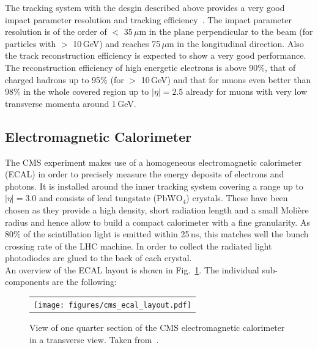 The tracking system with the desgin described above provides a very good impact parameter resolution and tracking efficiency~\cite{bib:cmstdr:tracker}. The impact parameter resolution is of the order of $<$ 35\,$\mu$m in the plane perpendicular to the beam (for particles with \pt $>$ 10\,GeV) and reaches 75\,$\mu$m in the longitudinal direction. Also the track reconstruction efficiency is expected to show a very good performance. The reconstruction efficiency of high energetic electrons is above 90\%, that of charged hadrons up to 95\% (for \pt $>$ 10\,GeV) and that for muons even better than 98\% in the whole covered region up to $|\eta| = 2.5$ already for muons with very low transverse momenta around 1\,GeV.  

\subsection{Electromagnetic Calorimeter}
\label{subsec:cms_ecal}
The CMS experiment makes use of a homogeneous electromagnetic calorimeter (ECAL) in order to precisely measure the energy deposits of electrons and photons. It is installed around the inner tracking system covering a range up to $|\eta| = 3.0$ and consists of lead tungstate (PbW$\mathrm{O}_4$) crystals. These have been chosen as they provide a high density, short radiation length and a small Moli\`{e}re radius and hence allow to build a compact calorimeter with a fine granularity. As 80\% of the scintillation light is emitted within 25\,ns, this matches well the bunch crossing rate of the LHC machine. In order to collect the radiated light photodiodes are glued to the back of each crystal. \\
An overview of the ECAL layout is shown in Fig.~\ref{fig:CMS_ecal}. The individual sub-components are the following:
\begin{figure}[!tp]
  \centering
  \begin{tabular}{c}
    \texttt{[image: figures/cms\_ecal\_layout.pdf]}
  \end{tabular}
  \caption{View of one quarter section of the CMS electromagnetic calorimeter in a transverse view. Taken from~\cite{bib:cmsptdr1}.}
  \label{fig:CMS_ecal}
\end{figure}

